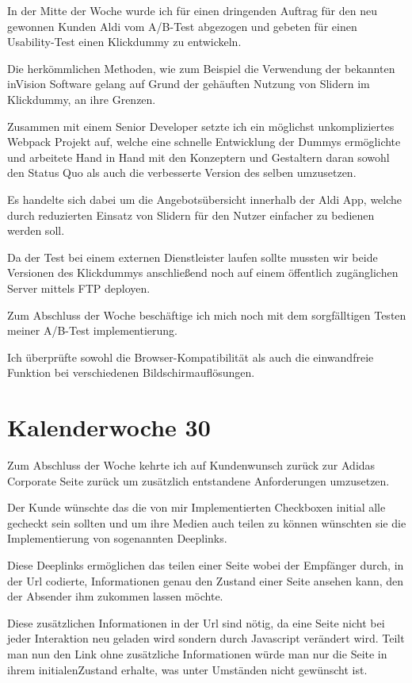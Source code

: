 \documentclass[11pt]{article} %
\begin{document}
In der Mitte der Woche wurde ich für einen dringenden Auftrag für den neu gewonnen Kunden Aldi vom A/B-Test abgezogen und gebeten für einen Usability-Test einen Klickdummy zu entwickeln.

Die herkömmlichen Methoden, wie zum Beispiel die Verwendung der bekannten inVision Software gelang auf Grund der gehäuften Nutzung von Slidern im Klickdummy, an ihre Grenzen.

Zusammen mit einem Senior Developer setzte ich ein möglichst unkompliziertes Webpack Projekt auf, welche eine schnelle Entwicklung der Dummys ermöglichte und arbeitete Hand in Hand mit den Konzeptern und Gestaltern daran sowohl den Status Quo als auch die verbesserte Version des selben umzusetzen.

Es handelte sich dabei um die Angebotsübersicht innerhalb der Aldi App, welche durch reduzierten Einsatz von Slidern für den Nutzer einfacher zu bedienen werden soll.

Da der Test bei einem externen Dienstleister laufen sollte mussten wir beide Versionen des Klickdummys anschließend noch auf einem öffentlich zugänglichen Server mittels FTP deployen.

Zum Abschluss der Woche beschäftige ich mich noch mit dem sorgfälltigen Testen meiner A/B-Test implementierung.

Ich überprüfte sowohl die Browser-Kompatibilität als auch die einwandfreie Funktion bei verschiedenen Bildschirmauflösungen.

\section{Kalenderwoche 30} \label{sec:kw3}

Zum Abschluss der Woche kehrte ich auf Kundenwunsch zurück zur Adidas Corporate Seite zurück um zusätzlich entstandene Anforderungen umzusetzen.

Der Kunde wünschte das die von mir Implementierten Checkboxen initial alle gecheckt sein sollten und um ihre Medien auch teilen zu können wünschten sie die Implementierung von sogenannten Deeplinks.

Diese Deeplinks ermöglichen das teilen einer Seite wobei der Empfänger durch, in der Url codierte, Informationen genau den Zustand einer Seite ansehen kann, den der Absender ihm zukommen lassen möchte.

Diese zusätzlichen Informationen in der Url sind nötig, da eine Seite nicht bei jeder Interaktion neu geladen wird sondern durch Javascript verändert wird. Teilt man nun den Link ohne zusätzliche Informationen würde man nur die Seite in ihrem initialenZustand erhalte, was unter Umständen nicht gewünscht ist.
\end{document}
